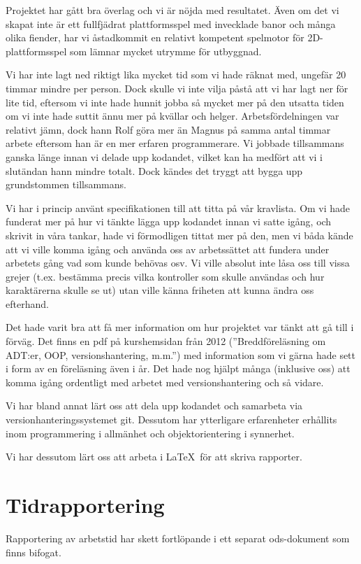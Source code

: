 \documentclass{scrartcl}
\begin{document}
Projektet har gått bra överlag och vi är nöjda med resultatet. Även om det vi skapat inte är ett fullfjädrat plattformsspel med invecklade banor och många olika fiender, har vi åstadkommit en relativt kompetent spelmotor för 2D-plattformsspel som lämnar mycket utrymme för utbyggnad.

Vi har inte lagt ned riktigt lika mycket tid som vi hade räknat med, ungefär 20 timmar mindre per person. Dock skulle vi inte vilja påstå att vi har lagt ner för lite tid, eftersom vi inte hade hunnit jobba så mycket mer på den utsatta tiden om vi inte hade suttit ännu mer på kvällar och helger. Arbetsfördelningen var relativt jämn, dock hann Rolf göra mer än Magnus på samma antal timmar arbete eftersom han är en mer erfaren programmerare. Vi jobbade tillsammans ganska länge innan vi delade upp kodandet, vilket kan ha medfört att vi i slutändan hann mindre totalt. Dock kändes det tryggt att bygga upp grundstommen tillsammans. 

Vi har i princip använt specifikationen till att titta på vår kravlista. Om vi hade funderat mer på hur vi tänkte lägga upp kodandet innan vi satte igång, och skrivit in våra tankar, hade vi förmodligen tittat mer på den, men vi båda kände att vi ville komma igång och använda oss av arbetssättet att fundera under arbetets gång vad som kunde behövas osv. Vi ville absolut inte låsa oss till vissa grejer (t.ex. bestämma precis vilka kontroller som skulle användas och hur karaktärerna skulle se ut) utan ville känna friheten att kunna ändra oss efterhand. 

Det hade varit bra att få mer information om hur projektet var tänkt att gå till i förväg. Det finns en pdf på kurshemsidan från 2012 (''Breddföreläsning om ADT:er, OOP, versionshantering, m.m.'') med information som vi gärna hade sett i form av en föreläsning även i år. Det hade nog hjälpt många (inklusive oss) att komma igång ordentligt med arbetet med versionshantering och så vidare.

Vi har bland annat lärt oss att dela upp kodandet och samarbeta via versionhanteringssystemet git. Dessutom har ytterligare erfarenheter erhållits inom programmering i allmänhet och objektorientering i synnerhet. 

Vi har dessutom lärt oss att arbeta i \LaTeX\ för att skriva rapporter.

\section{Tidrapportering}
Rapportering av arbetstid har skett fortlöpande i ett separat ods-dokument som finns bifogat.
\end{document}
